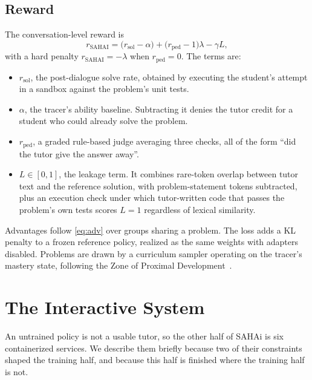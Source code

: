 \documentclass[conference]{IEEEtran}
\begin{document}
\subsection{Reward}

The conversation-level reward is
\begin{equation}
r_{\mathrm{SAHAI}}=\bigl(r_{\mathrm{sol}}-\alpha\bigr)
+\bigl(r_{\mathrm{ped}}-1\bigr)\lambda-\gamma L,
\label{eq:reward}
\end{equation}
with a hard penalty $r_{\mathrm{SAHAI}}=-\lambda$ when
$r_{\mathrm{ped}}=0$. The terms are:
\begin{itemize}[leftmargin=*,topsep=2pt,itemsep=1pt,parsep=0pt]
\item $r_{\mathrm{sol}}$, the post-dialogue solve rate, obtained by
      executing the student's attempt in a sandbox against the problem's
      unit tests.
\item $\alpha$, the tracer's ability baseline. Subtracting it denies
      the tutor credit for a student who could already solve the problem.
\item $r_{\mathrm{ped}}$, a graded rule-based judge averaging three
      checks, all of the form ``did the tutor give the answer away''.
\item $L\in[0,1]$, the leakage term. It combines rare-token overlap
      between tutor text and the reference solution, with
      problem-statement tokens subtracted, plus an execution check under
      which tutor-written code that passes the problem's own tests scores
      $L{=}1$ regardless of lexical similarity.
\end{itemize}

Advantages follow \eqref{eq:adv} over groups sharing a problem. The loss
adds a KL penalty to a frozen reference policy, realized as the same
weights with adapters disabled. Problems are drawn by a curriculum sampler
operating on the tracer's mastery state, following the Zone of Proximal
Development~\cite{vygotsky}.

\section{The Interactive System}
\label{sec:interactive}

An untrained policy is not a usable tutor, so the other half of SAHAi is six
containerized services. We describe them briefly because two of their
constraints shaped the training half, and because this half is finished where
the training half is not.
\end{document}
